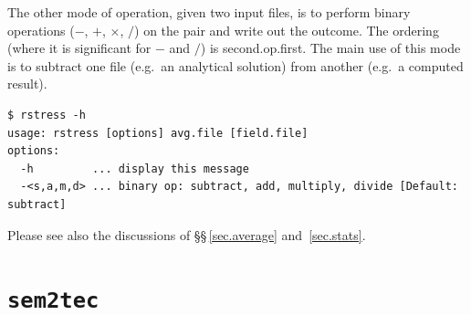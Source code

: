 \documentclass[11pt]{report}
\newcommand{\eg}{e.g.\ } \newcommand{\CC}{\mathrm{c.c.}}
\begin{document}
The other mode of operation, given two input files, is to perform
binary operations ($-$, $+$, $\times$, $/$) on the pair and write out
the outcome.  The ordering (where it is significant for $-$ and $/$)
is second.op.first.  The main use of this mode is to subtract one file
(\eg an analytical solution) from another (\eg a computed result).
%
{\small
\begin{verbatim}
$ rstress -h
usage: rstress [options] avg.file [field.file]
options:
  -h         ... display this message
  -<s,a,m,d> ... binary op: subtract, add, multiply, divide [Default: subtract]
\end{verbatim}
}
%
Please see also the discussions of \S\S\,\ref{sec.average}
and~\ref{sec.stats}.



\section{\texttt{sem2tec}}
\label{sec.sem2tec}
\end{document}
